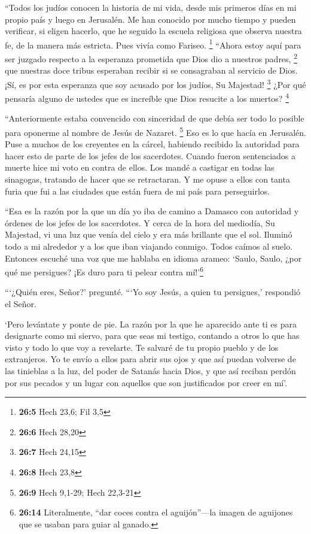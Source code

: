  ``Todos los judíos conocen la historia de mi vida, desde
mis primeros días en mi propio país y luego en Jerusalén. 
Me han conocido por mucho tiempo y pueden verificar, si eligen hacerlo,
que he seguido la escuela religiosa que observa nuestra fe, de la manera
más estricta. Pues vivía como Fariseo. \footnote{\textbf{26:5} Hech
  23,6; Fil 3,5}  ``Ahora estoy aquí para ser juzgado
respecto a la esperanza prometida que Dios dio a nuestros padres,
\footnote{\textbf{26:6} Hech 28,20}  que nuestras doce
tribus esperaban recibir si se consagraban al servicio de Dios. ¡Sí, es
por esta esperanza que soy acusado por los judíos, Su Majestad!
\footnote{\textbf{26:7} Hech 24,15}  ¿Por qué pensaría
alguno de ustedes que es increíble que Dios resucite a los muertos?
\footnote{\textbf{26:8} Hech 23,8}

 ``Anteriormente estaba convencido con sinceridad de que
debía ser todo lo posible para oponerme al nombre de Jesús de Nazaret.
\footnote{\textbf{26:9} Hech 9,1-29; Hech 22,3-21}  Eso
es lo que hacía en Jerusalén. Puse a muchos de los creyentes en la
cárcel, habiendo recibido la autoridad para hacer esto de parte de los
jefes de los sacerdotes. Cuando fueron sentenciados a muerte hice mi
voto en contra de ellos.  Los mandé a castigar en todas
las sinagogas, tratando de hacer que se retractaran. Y me opuse a ellos
con tanta furia que fui a las ciudades que están fuera de mi país para
perseguirlos.

 ``Esa es la razón por la que un día yo iba de camino a
Damasco con autoridad y órdenes de los jefes de los sacerdotes.
 Y cerca de la hora del mediodía, Su Majestad, vi una luz
que venía del cielo y era más brillante que el sol. Iluminó todo a mi
alrededor y a los que iban viajando conmigo.  Todos
caímos al suelo. Entonces escuché una voz que me hablaba en idioma
arameo: `Saulo, Saulo, ¿por qué me persigues? ¡Es duro para ti pelear
contra mí!'\footnote{\textbf{26:14} Literalmente, ``dar coces contra el
  aguijón''---la imagen de aguijones que se usaban para guiar al ganado.}

 ```¿Quién eres, Señor?' pregunté. ```Yo soy Jesús, a
quien tu persigues,' respondió el Señor.

 `Pero levántate y ponte de pie. La razón por la que he
aparecido ante ti es para designarte como mi siervo, para que seas mi
testigo, contando a otros lo que has visto y todo lo que voy a
revelarte.  Te salvaré de tu propio pueblo y de los
extranjeros. Yo te envío a ellos  para abrir sus ojos y
que así puedan volverse de las tinieblas a la luz, del poder de Satanás
hacia Dios, y que así reciban perdón por sus pecados y un lugar con
aquellos que son justificados por creer en mí'.

